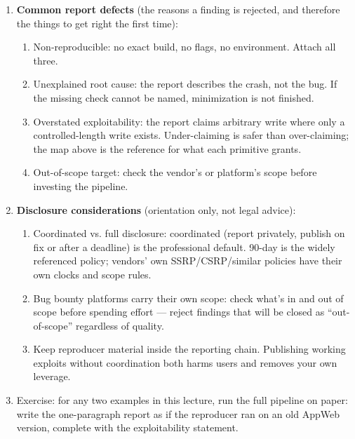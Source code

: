 \documentclass[12pt]{Training}
\begin{document}
\begin{enumerate}
    \item \textbf{Common report defects} (the reasons a finding is rejected, and therefore the things to get right the first time):
    \begin{enumerate}
        \item Non-reproducible: no exact build, no flags, no environment. Attach all three.
        \item Unexplained root cause: the report describes the crash, not the bug. If the missing check cannot be named, minimization is not finished.
        \item Overstated exploitability: the report claims arbitrary write where only a controlled-length write exists. Under-claiming is safer than over-claiming; the map above is the reference for what each primitive grants.
        \item Out-of-scope target: check the vendor's or platform's scope before investing the pipeline.
    \end{enumerate}
    \item \textbf{Disclosure considerations} (orientation only, not legal advice):
    \begin{enumerate}
        \item Coordinated vs. full disclosure: coordinated (report privately, publish on fix or after a deadline) is the professional default. 90-day is the widely referenced policy; vendors' own SSRP/CSRP/similar policies have their own clocks and scope rules.
        \item Bug bounty platforms carry their own scope: check what's in and out of scope before spending effort --- reject findings that will be closed as ``out-of-scope'' regardless of quality.
        \item Keep reproducer material inside the reporting chain. Publishing working exploits without coordination both harms users and removes your own leverage.
    \end{enumerate}
    \item Exercise: for any two examples in this lecture, run the full pipeline on paper: write the one-paragraph report as if the reproducer ran on an old AppWeb version, complete with the exploitability statement.
\end{enumerate}

\end{document}
